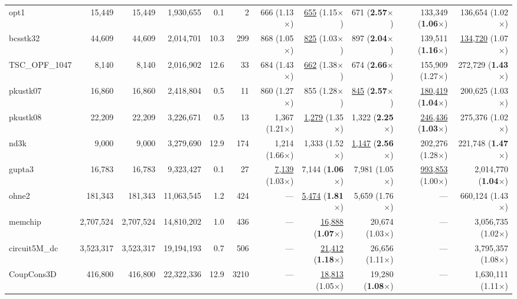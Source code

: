 \begin{table}[t!]
{\begin{tabular}{l|rrrrr|rrr|rr}
    opt1 & 15,449 & 15,449 & 1,930,655 & 0.1 & 2 & 666 (1.13$\times$) & \underline{655} (1.15$\times$) & 671 (\textbf{2.57}$\times$) & 133,349 (\textbf{1.06}$\times$) & 136,654 (1.02$\times$) \\
    bcsstk32 & 44,609 & 44,609 & 2,014,701 & 10.3 & 299 & 868 (1.05$\times$) & \underline{825} (1.03$\times$) & 897 (\textbf{2.04}$\times$) & 139,511 (\textbf{1.16}$\times$) & \underline{134,720} (1.07$\times$) \\
    TSC\_OPF\_1047 & 8,140 & 8,140 & 2,016,902 & 12.6 & 33 & 684 (1.43$\times$) & \underline{662} (1.38$\times$) & 674 (\textbf{2.66}$\times$) & 155,909 (1.27$\times$) & 272,729 (\textbf{1.43}$\times$) \\
    pkustk07 & 16,860 & 16,860 & 2,418,804 & 0.5 & 11 & 860 (1.27$\times$) & 855 (1.28$\times$) & \underline{845} (\textbf{2.57}$\times$) & \underline{180,419} (\textbf{1.04}$\times$) & 200,625 (1.03$\times$) \\
    pkustk08 & 22,209 & 22,209 & 3,226,671 & 0.5 & 13 & 1,367 (1.21$\times$) & \underline{1,279} (1.35$\times$) & 1,322 (\textbf{2.25}$\times$) & \underline{246,436} (\textbf{1.03}$\times$) & 275,376 (1.02$\times$) \\
    nd3k & 9,000 & 9,000 & 3,279,690 & 12.9 & 174 & 1,214 (1.66$\times$) & 1,333 (1.52$\times$) & \underline{1,147} (\textbf{2.56}$\times$) & 202,276 (1.28$\times$) & 221,748 (\textbf{1.47}$\times$) \\
    gupta3 & 16,783 & 16,783 & 9,323,427 & 0.1 & 27 & \underline{7,139} (1.03$\times$) & 7,144 (\textbf{1.06}$\times$) & 7,981 (1.05$\times$) & \underline{993,853} (1.00$\times$) & 2,014,770 (\textbf{1.04}$\times$) \\
    ohne2 & 181,343 & 181,343 & 11,063,545 & 1.2 & 424 & --- & \underline{5,474} (\textbf{1.81}$\times$) & 5,659 (1.76$\times$) & --- & 660,124 (1.43$\times$) \\
    memchip & 2,707,524 & 2,707,524 & 14,810,202 & 1.0 & 436 & --- & \underline{16,888} (\textbf{1.07}$\times$) & 20,674 (1.03$\times$) & --- & 3,056,735 (1.02$\times$) \\
    circuit5M\_dc & 3,523,317 & 3,523,317 & 19,194,193 & 0.7 & 506 & --- & \underline{21,412} (\textbf{1.18}$\times$) & 26,656 (1.11$\times$) & --- & 3,795,357 (1.08$\times$) \\
    CoupCons3D & 416,800 & 416,800 & 22,322,336 & 12.9 & 3210 & --- & \underline{18,813} (1.05$\times$) & 19,280 (\textbf{1.08}$\times$) & --- & 1,630,111 (1.11$\times$) \\
    \bottomrule
    \end{tabular}
    }
\end{table}
